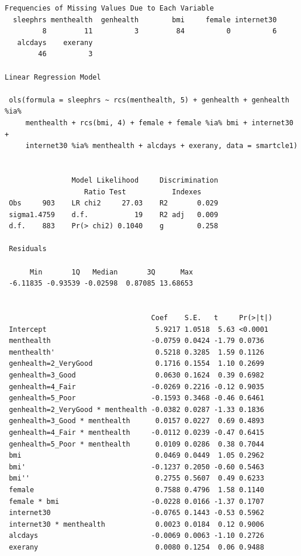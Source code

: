 \documentclass[]{book}
\theoremstyle{definition}
\theoremstyle{definition}
\theoremstyle{definition}
\theoremstyle{remark}
\begin{document}
\begin{verbatim}
Frequencies of Missing Values Due to Each Variable
  sleephrs menthealth  genhealth        bmi     female internet30 
         8         11          3         84          0          6 
   alcdays    exerany 
        46          3 

Linear Regression Model
 
 ols(formula = sleephrs ~ rcs(menthealth, 5) + genhealth + genhealth %ia% 
     menthealth + rcs(bmi, 4) + female + female %ia% bmi + internet30 + 
     internet30 %ia% menthealth + alcdays + exerany, data = smartcle1)
 
 
                Model Likelihood     Discrimination    
                   Ratio Test           Indexes        
 Obs     903    LR chi2     27.03    R2       0.029    
 sigma1.4759    d.f.           19    R2 adj   0.009    
 d.f.    883    Pr(> chi2) 0.1040    g        0.258    
 
 Residuals
 
      Min       1Q   Median       3Q      Max 
 -6.11835 -0.93539 -0.02598  0.87085 13.68653 
 
 
                                   Coef    S.E.   t     Pr(>|t|)
 Intercept                          5.9217 1.0518  5.63 <0.0001 
 menthealth                        -0.0759 0.0424 -1.79 0.0736  
 menthealth'                        0.5218 0.3285  1.59 0.1126  
 genhealth=2_VeryGood               0.1716 0.1554  1.10 0.2699  
 genhealth=3_Good                   0.0630 0.1624  0.39 0.6982  
 genhealth=4_Fair                  -0.0269 0.2216 -0.12 0.9035  
 genhealth=5_Poor                  -0.1593 0.3468 -0.46 0.6461  
 genhealth=2_VeryGood * menthealth -0.0382 0.0287 -1.33 0.1836  
 genhealth=3_Good * menthealth      0.0157 0.0227  0.69 0.4893  
 genhealth=4_Fair * menthealth     -0.0112 0.0239 -0.47 0.6415  
 genhealth=5_Poor * menthealth      0.0109 0.0286  0.38 0.7044  
 bmi                                0.0469 0.0449  1.05 0.2962  
 bmi'                              -0.1237 0.2050 -0.60 0.5463  
 bmi''                              0.2755 0.5607  0.49 0.6233  
 female                             0.7588 0.4796  1.58 0.1140  
 female * bmi                      -0.0228 0.0166 -1.37 0.1707  
 internet30                        -0.0765 0.1443 -0.53 0.5962  
 internet30 * menthealth            0.0023 0.0184  0.12 0.9006  
 alcdays                           -0.0069 0.0063 -1.10 0.2726  
 exerany                            0.0080 0.1254  0.06 0.9488  
 
\end{verbatim}
\end{document}
